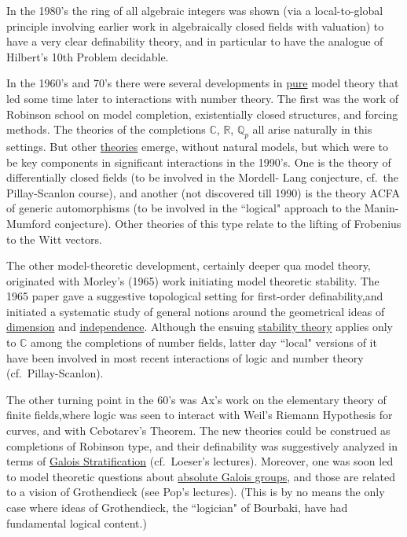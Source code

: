 \documentclass{article}
\begin{document}
In the 1980's the ring of all algebraic integers was 
shown
(via a local-to-global principle involving earlier work in
algebraically closed fields with valuation) to have a very 
clear
definability theory, and in particular to have the analogue 
of
Hilbert's 10th Problem decidable.


In the 1960's and 70's there were several developments in
\underline{pure} model theory that led some time later to
interactions with number theory. The first was the work of
Robinson school on model completion, existentially closed
structures, and forcing methods. The theories of the 
completions
${\mathbb C}$, ${\mathbb R}$, ${\mathbb Q}_p$ all arise 
naturally in
this settings. But other \underline{theories} emerge, 
without
natural models, but which were to be key components in
significant interactions in the 1990's. One is the theory of
differentially closed fields (to be involved in the Mordell-
Lang
conjecture, cf.~the Pillay-Scanlon course), and another (not
discovered till 1990) is the theory ACFA of generic 
automorphisms
(to be involved in the ``logical" approach to the Manin-
Mumford
conjecture). Other theories of this type relate to the 
lifting of
Frobenius to the Witt vectors.



The other model-theoretic development, certainly deeper qua 
model
theory, originated with Morley's (1965) work initiating
model theoretic stability. The 1965 paper gave a suggestive
topological setting for first-order definability,and 
initiated a
systematic study of general notions around the geometrical 
ideas
of \underline{dimension} and \underline {independence}. Although the
ensuing \underline{stability theory} applies only to ${\mathbb C}$
among the completions of number fields, latter day ``local" 
versions
of it have been involved in most recent interactions of logic 
and
number theory (cf.~Pillay-Scanlon).



The other turning point in the 60's was Ax's work on the
elementary theory of finite fields,where logic was seen to
interact with Weil's Riemann Hypothesis for curves, and with
Cebotarev's Theorem. The new theories could be construed as
completions of Robinson type, and their definability was
suggestively analyzed in terms of \underline{Galois
Stratification} (cf.~Loeser's lectures). Moreover, one was 
soon led
to model theoretic questions about \underline{absolute Galois
groups}, and those are related to a vision of Grothendieck 
(see
Pop's lectures). (This is by no means the only case where 
ideas of
Grothendieck, the ``logician" of Bourbaki, have had fundamental
logical content.)
\end{document}
